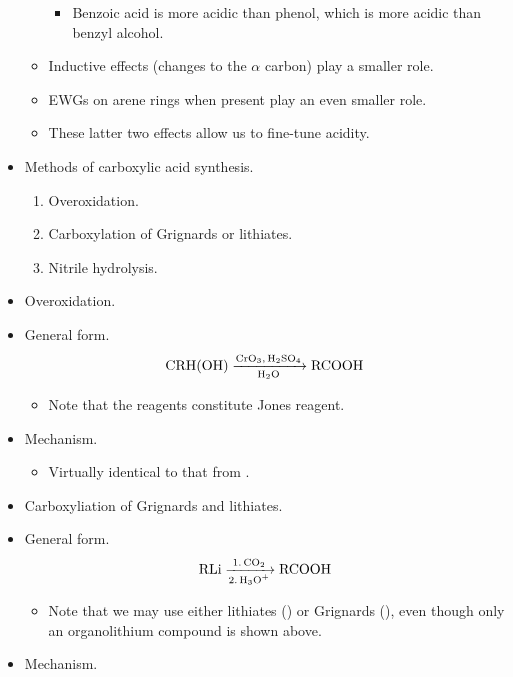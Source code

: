 \documentclass[../notes.tex]{subfiles}
\begin{document}
\begin{itemize}
\begin{itemize}
        \begin{itemize}
            \item Benzoic acid is more acidic than phenol, which is more acidic than benzyl alcohol.
        \end{itemize}
        \item Inductive effects (changes to the $\alpha$ carbon) play a smaller role.
        \item EWGs on arene rings when present play an even smaller role.
        \item These latter two effects allow us to fine-tune acidity.
    \end{itemize}
    \item Methods of carboxylic acid synthesis.
    \begin{enumerate}
        \item Overoxidation.
        \item Carboxylation of Grignards or lithiates.
        \item Nitrile hydrolysis.
    \end{enumerate}
    \item Overoxidation.
    \item General form.
    \begin{equation*}
        \ce{CRH(OH) ->[CrO3, H2SO4][H2O] RCOOH}
    \end{equation*}
    \begin{itemize}
        \item Note that the reagents constitute Jones reagent.
    \end{itemize}
    \item Mechanism.
    \begin{itemize}
        \item Virtually identical to that from \textcite{bib:CHEM22100Notes}.
    \end{itemize}
    \item Carboxyliation of Grignards and lithiates.
    \item General form.
    \begin{equation*}
        \ce{RLi ->[1. CO2][2. H3O+] RCOOH}
    \end{equation*}
    \begin{itemize}
        \item Note that we may use either lithiates () or Grignards (), even though only an organolithium compound is shown above.
    \end{itemize}
    \item Mechanism.

\end{itemize}
\end{document}
